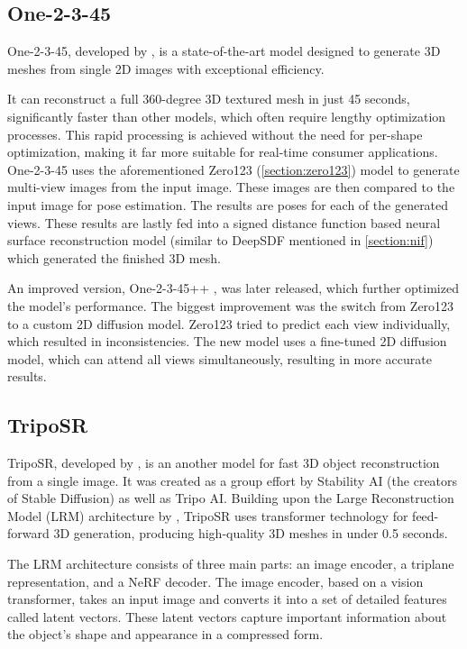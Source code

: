 \subsection{One-2-3-45}
One-2-3-45, developed by \textcite{liu_one-2-3-45_2023}, is a state-of-the-art model designed to generate 3D meshes from single 2D images with exceptional efficiency.

It can reconstruct a full 360-degree 3D textured mesh in just 45 seconds, significantly faster than other models, which often require lengthy optimization processes. This rapid processing is achieved without the need for per-shape optimization, making it far more suitable for real-time consumer applications.
One-2-3-45 uses the aforementioned Zero123 (\ref{section:zero123}) model to generate multi-view images from the input image. These images are then compared to the input image for pose estimation. The results are poses for each of the generated views.
These results are lastly fed into a signed distance function based neural surface reconstruction model (similar to DeepSDF mentioned in \ref{section:nif}) which generated the finished 3D mesh.

An improved version, One-2-3-45++ \autocite{liu_one-2-3-45_2024}, was later released, which further optimized the model's performance.
The biggest improvement was the switch from Zero123 to a custom 2D diffusion model. Zero123 tried to predict each view individually, which resulted in inconsistencies. The new model uses a fine-tuned 2D diffusion model, which can attend all views simultaneously, resulting in more accurate results.

\subsection{TripoSR}
TripoSR, developed by \textcite{tochilkin_triposr_2024}, is an another model for fast 3D object reconstruction from a single image.
It was created as a group effort by Stability AI (the creators of Stable Diffusion) as well as Tripo AI.
Building upon the Large Reconstruction Model (LRM) architecture by \textcite{hong_lrm_2024}, TripoSR uses transformer technology for feed-forward 3D generation, producing high-quality 3D meshes in under 0.5 seconds.

The LRM architecture consists of three main parts: an image encoder, a triplane representation, and a NeRF decoder. The image encoder, based on a vision transformer, takes an input image and converts it into a set of detailed features called latent vectors. These latent vectors capture important information about the object's shape and appearance in a compressed form.


